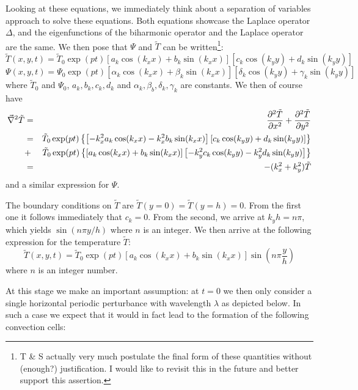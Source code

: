 Looking at these equations, we immediately think about a separation of variables approach to solve these equations. Both equations showcase the Laplace operator $\Delta$, and the eigenfunctions of the biharmonic operator and the Laplace operator are the same. 
We then pose that $\Psi$ and $\tilde{T}$ can be written\footnote{T \& S actually very much postulate the final form of these quantities without (enough?) justification. I would like to revisit this in the future and better support this assertion.
}:
\[
\tilde{T}(x,y,t) = \tilde{T}_0 \exp(pt) 
\left[a_k \cos(k_x x) + b_k \sin(k_x x) \right]
\left[c_k \cos(k_y y) + d_k \sin(k_y y) \right]
\]
\[
\Psi(x,y,t)=
\Psi_0 \exp(pt) 
\left[\alpha_k \cos(k_x x) + \beta_k \sin(k_x x) \right]
\left[\delta_k \cos(k_y y) + \gamma_k \sin(k_y y) \right] 
\]
where $\tilde{T}_0$ and $\Psi_0$, $a_k,b_k,c_k,d_k$ and $\alpha_k,\beta_b,\delta_k,\gamma_k$ are constants.
We then of course have 
\begin{eqnarray}
\vec\nabla^2 \tilde{T} 
&=& \frac{\partial^2 \tilde{T}}{\partial x^2 } + \frac{\partial^2 \tilde{T}}{\partial y^2 }  \nonumber\\
&=& \tilde{T}_0 \exp (pt) 
\left\{
\left[-k_x^2 a_k \cos(k_x x) -k_x^2 b_k \sin(k_x x) \right]
\left[c_k \cos(k_y y) + d_k \sin(k_y y) \right]
\right\} \nonumber\\
&+& \tilde{T}_0 \exp (pt) 
\left\{
\left[a_k \cos(k_x x) + b_k \sin(k_x x) \right]
\left[-k_y^2 c_k \cos(k_y y) -k_y^2 d_k \sin(k_y y) \right]
\right\} \nonumber\\
&=& -(k_x^2 + k_y^2) \tilde{T} \label{eigenTtilde}
\end{eqnarray}
and a similar expression for $\Psi$.

The boundary conditions on $\tilde{T}$ are $\tilde{T}(y=0)=\tilde{T}(y=h)=0$.
From the first one it follows immediately that $c_k=0$. 
From the second, we arrive at $k_y h = n \pi$, which yields $\sin ( n \pi y/h)$
where $n$ is an integer.
We then arrive at the following expression for the temperature $\tilde{T}$:
\[
\tilde{T}(x,y,t) = 
\tilde{T}_0 \exp(pt) 
\left[a_k \cos(k_x x) + b_k \sin(k_x x) \right]
\sin \left(n\pi \frac{y}{h} \right)
\]
where $n$ is an integer number.

At this stage we make an important assumption:
at $t=0$ we then only consider a single horizontal periodic perturbance 
with wavelength $\lambda$ as depicted below. In such a case we expect that 
it would in fact lead to the formation of the following convection cells:

